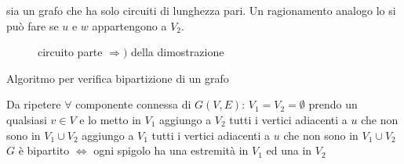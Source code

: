 \documentclass[a4paper, oneside, openany]{book}
\theoremstyle{plain}
\theoremstyle{definition}
\begin{document}
sia un grafo che ha solo circuiti di lunghezza pari. Un ragionamento analogo lo si può fare se
$u$ e $w$ appartengono a $V_2$.
\begin{figure}[!ht]
    \centering
    \caption{circuito parte $\Longrightarrow)$ della dimostrazione}
    \label{fig:circuito_dim}
\end{figure}
\endproof


\begin{algorithm}
\caption{Algoritmo per verifica bipartizione di un grafo}\label{alg:algo_bipartizione}
\begin{algorithmic} 
\STATE Da ripetere $\forall$ componente connessa di $G(V,E)$:
\STATE $V_1 = V_2 = \emptyset$
\STATE prendo un qualsiasi $v \in V$ e lo metto in $V_1$
    \STATE{}
        \STATE aggiungo a $V_2$ tutti i vertici adiacenti a $u$ che non sono in $V_1 \cup V_2$
    \ELSE
        \STATE aggiungo a $V_1$ tutti i vertici adiacenti a $u$ che non sono in $V_1 \cup V_2$
    \ENDIF
\ENDFOR
\STATE $G$ è bipartito $\iff$ ogni spigolo ha una estremità in $V_1$ ed una in $V_2$

\end{algorithmic}
\end{algorithm}
\end{document}
